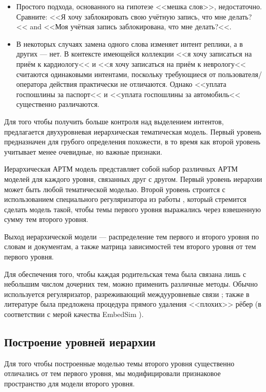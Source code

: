\begin{itemize}
\item Простого подхода, основанного на гипотезе <<мешка слов>>, недостаточно. Сравните: <<Я хочу заблокировать свою учётную запись, что мне делать?<< and <<Моя учётная запись заблокирована, что мне делать?<<.
\item В некоторых случаях замена одного слова изменяет интент реплики, а в других --- нет. В контексте имеющейся коллекции <<я хочу записаться на приём к кардиологу<< и <<я хочу записаться на приём к неврологу<< считаются одинаковыми интентами, поскольку требующиеся от пользователя/оператора действия практически не отличаются. Однако <<уплата госпошлины за паспорт<< и <<уплата госпошлины за автомобиль<< существенно различаются. 
\end{itemize}

Для того чтобы получить больше контроля над выделением интентов, предлагается двухуровневая иерархическая тематическая модель. Первый уровень предназначен для грубого определения похожести, в то время как второй уровень учитывает менее очевидные, но важные признаки.

Иерархическая АРТМ модель представляет собой набор различных АРТМ моделей для каждого уровня, связанных друг с другом. Первый уровень иерархии может быть любой тематической моделью. Второй уровень строится с использованием специального регуляризатора из работы \cite{chirkova2016additive}, который стремится сделать модель такой, чтобы темы первого уровня выражались через взвешенную сумму тем второго уровня.

Выход иерархической модели — распределение тем первого и второго уровня по словам и документам, а также матрица зависимостей тем второго уровня от тем первого уровня.

Для обеспечения того, чтобы каждая родительская тема была связана лишь с небольшим числом дочерних тем, можно применить различные методы. Обычно используется регуляризатор, разреживающий междууровневые связи \cite{chirkova2016additive} ; также в литературе была предложена процедура прямого удаления <<плохих>> рёбер (в соответствии с мерой качества EmbedSim \cite{belyy}).

\subsection{Построение уровней иерархии} \label{hierarchy_distinct}

Для того чтобы построенные моделью темы второго уровня существенно отличались от тем первого уровня, мы модифицировали признаковое пространство для модели второго уровня.

